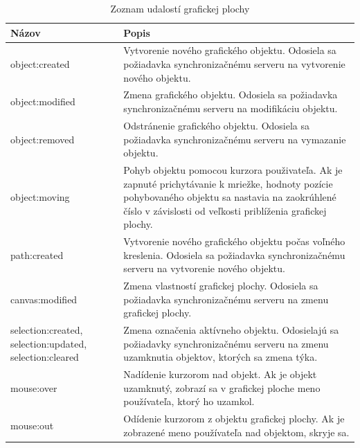 \begin{table}
	\begin{tabular}{ | m{4cm} | m{8.5cm} | } \hline
		\textbf{Názov} & \textbf{Popis} \\ \hline \hline
		
		object:created & Vytvorenie nového grafického objektu. Odosiela sa požiadavka synchronizačnému serveru na vytvorenie nového objektu. \\\hline
		object:modified & Zmena grafického objektu. Odosiela sa požiadavka synchronizačnému serveru na modifikáciu objektu. \\\hline
		object:removed & Odstránenie grafického objektu. Odosiela sa požiadavka synchronizačnému serveru na vymazanie objektu.  \\\hline
		object:moving & Pohyb objektu pomocou kurzora použivateľa. Ak je zapnuté prichytávanie k mriežke, hodnoty pozície pohybovaného objektu sa nastavia na zaokrúhlené číslo v závislosti od veľkosti priblíženia grafickej plochy.  \\\hline
		path:created & Vytvorenie nového grafického objektu počas voľného kreslenia. Odosiela sa požiadavka synchronizačnému serveru na vytvorenie nového objektu. \\\hline
		canvas:modified & Zmena vlastností grafickej plochy. Odosiela sa požiadavka synchronizačnému serveru na zmenu grafickej plochy. \\\hline
		selection:created, selection:updated, selection:cleared & Zmena označenia aktívneho objektu. Odosielajú sa požiadavky synchronizačnému serveru na zmenu uzamknutia objektov, ktorých sa zmena týka. \\\hline
		mouse:over & Nadídenie kurzorom nad objekt. Ak je objekt uzamknutý, zobrazí sa v grafickej ploche meno používateľa, ktorý ho uzamkol. \\\hline
		mouse:out & Odídenie kurzorom z objektu grafickej plochy. Ak je zobrazené meno používateľa nad objektom, skryje sa. \\\hline
		
		\hline
	\end{tabular}
	\caption{Zoznam udalostí grafickej plochy}
	\label{tab:editor-events}
\end{table}


